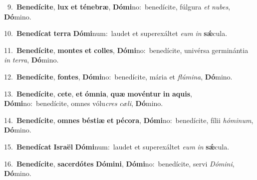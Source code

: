 {{\numbfont\textcolor{\numbcolor}{~9.}}~\-\textbf{Be}\-\textbf{ne}\textbf{dí}\textbf{ci}\textbf{te}, \textbf{lux} \textbf{et} \textbf{té}\-\textbf{ne}\textbf{bræ}, \textbf{Dó}\-\textbf{mi}no:~\star benedícite, fúlgura \textit{et} \textit{nu}\-\textit{bes}, \textbf{Dó}\-mino.\par
{\numbfont\textcolor{\numbcolor}{10.}}~\-\textbf{Be}\-\textbf{ne}\textbf{dí}\textbf{cat} \textbf{ter}\-\textbf{ra} \textbf{Dó}\-\textbf{mi}num:~\star laudet et superexáltet \textit{e}\-\textit{um} \textit{in} \textbf{sǽ}\-cula.\par
{\numbfont\textcolor{\numbcolor}{11.}}~\-\textbf{Be}\-\textbf{ne}\textbf{dí}\textbf{ci}\textbf{te}, \textbf{mon}\-\textbf{tes} \textbf{et} \textbf{col}\-\textbf{les}, \textbf{Dó}\-\textbf{mi}no:~\star benedícite, univérsa germinántia \textit{in} \textit{ter}\-\textit{ra}, \textbf{Dó}\-mino.\par
{\numbfont\textcolor{\numbcolor}{12.}}~\-\textbf{Be}\-\textbf{ne}\textbf{dí}\textbf{ci}\textbf{te}, \textbf{fon}\-\textbf{tes}, \textbf{Dó}\-\textbf{mi}no:~\star benedícite, mária et \textit{flú}\-\textit{mi}\textit{na}, \textbf{Dó}\-mino.\par
{\numbfont\textcolor{\numbcolor}{13.}}~\-\textbf{Be}\-\textbf{ne}\textbf{dí}\textbf{ci}\textbf{te}, \textbf{ce}\-\textbf{te}, \textbf{et} \textbf{óm}\-\textbf{ni}\textbf{a}, \textbf{quæ} \textbf{mo}\-\textbf{vén}\textbf{tur} \textbf{in} \textbf{a}\-\textbf{quis}, \textbf{Dó}\-\textbf{mi}no:~\star benedícite, omnes vólu\textit{cres} \textit{cæ}\-\textit{li}, \textbf{Dó}\-mino.\par
{\numbfont\textcolor{\numbcolor}{14.}}~\-\textbf{Be}\-\textbf{ne}\textbf{dí}\textbf{ci}\textbf{te}, \textbf{om}\-\textbf{nes} \textbf{bés}\-\textbf{ti}\textbf{æ} \textbf{et} \textbf{pé}\-\textbf{co}\textbf{ra}, \textbf{Dó}\-\textbf{mi}no:~\star benedícite, fílii \textit{hó}\-\textit{mi}\textit{num}, \textbf{Dó}\-mino.\par
{\numbfont\textcolor{\numbcolor}{15.}}~\-\textbf{Be}\-\textbf{ne}\textbf{dí}\textbf{cat} \textbf{Is}\-\textbf{ra}\textbf{ël} \textbf{Dó}\-\textbf{mi}num:~\star laudet et superexáltet \textit{e}\-\textit{um} \textit{in} \textbf{sǽ}\-cula.\par
{\numbfont\textcolor{\numbcolor}{16.}}~\-\textbf{Be}\-\textbf{ne}\textbf{dí}\textbf{ci}\textbf{te}, \textbf{sa}\-\textbf{cer}\textbf{dó}\textbf{tes} \textbf{Dó}\-\textbf{mi}\textbf{ni}, \textbf{Dó}\-\textbf{mi}no:~\star benedícite, servi \textit{Dó}\-\textit{mi}\textit{ni}, \textbf{Dó}\-mino.\par
}
